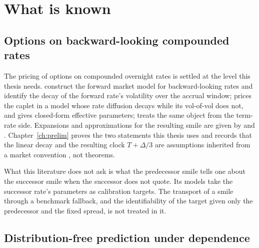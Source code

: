 \documentclass[../../../main.tex]{subfiles}
\begin{document}
\section{What is known}\label{sec:intro-literature}

\subsection{Options on backward-looking compounded rates}

The pricing of options on compounded overnight rates is settled at the level this thesis needs. \citet{lyashenko2019,lyashenko2020} construct the forward market model for backward-looking rates and identify the decay of the forward rate's volatility over the accrual window; \citet{willems2020} prices the caplet in a model whose rate diffusion decays while its vol-of-vol does not, and gives closed-form effective parameters; \citet{piterbarg2020} treats the same object from the term-rate side. Expansions and approximations for the resulting smile are given by \citet{turfus2023} and \citet{brace2024}. Chapter~\ref{ch:prelim} proves the two statements this thesis uses and records that the linear decay and the resulting clock $T+\Delta/3$ are assumptions inherited from a market convention \citep[\S8.3.2, eqs.~(15)--(16), p.~29]{sarb2024conv}, not theorems.

What this literature does not ask is what the predecessor smile tells one about the successor smile when the successor does not quote. Its models take the successor rate's parameters as calibration targets. The transport of a smile through a benchmark fallback, and the identifiability of the target given only the predecessor and the fixed spread, is not treated in it.

\subsection{Distribution-free prediction under dependence}
\end{document}
